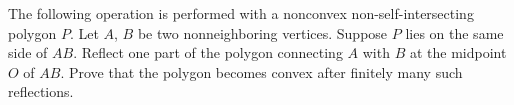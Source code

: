 The following operation is performed with a nonconvex non-self-intersecting polygon $P$. Let $A$, $B$ be two nonneighboring vertices. Suppose $P$ lies on the same side of $AB$. Reflect one part of the polygon connecting $A$ with $B$ at the midpoint $O$ of $AB$. Prove that the polygon becomes convex after finitely many such reflections.
